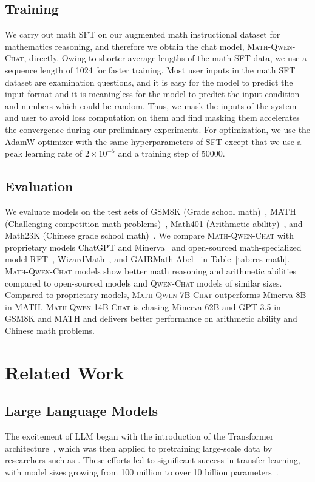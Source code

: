 \subsection{Training}
We carry out math SFT on our augmented math instructional dataset for mathematics reasoning, and therefore we obtain the chat model, \textsc{Math-Qwen-Chat}, directly. Owing to shorter average lengths of the math SFT data, we use a sequence length of \num{1024} for faster training. Most user inputs in the math SFT dataset are examination questions, and it is easy for the model to predict the input format and it is meaningless for the model to predict the input condition and numbers which could be random. Thus, we mask the inputs of the system and user to avoid loss computation on them and find masking them accelerates the convergence during our preliminary experiments. For optimization, we use the AdamW optimizer with the same hyperparameters of SFT except that we use a peak learning rate of $2 \times 10^{-5}$ and a training step of \num{50000}. 

\subsection{Evaluation}
We evaluate models on the test sets of GSM8K (Grade school math)~\citep{gsm8k}, MATH (Challenging competition math problems)~\citep{hendrycks2021measuring}, Math401 (Arithmetic ability)~\citep{math401}, and Math23K (Chinese grade school math)~\citep{Wang2017DeepNS}. We compare \textsc{Math-Qwen-Chat} with proprietary models ChatGPT and Minerva~\citep{lewkowycz2022solving} and open-sourced math-specialized model RFT~\citep{rft}, WizardMath~\citep{wizardmath}, and GAIRMath-Abel~\citep{abel} in Table~\ref{tab:res-math}.
\textsc{Math-Qwen-Chat} models show better math reasoning and arithmetic abilities compared to open-sourced models and \textsc{Qwen-Chat} models of similar sizes. Compared to proprietary models, \textsc{Math-Qwen-7B-Chat} outperforms Minerva-8B in MATH.
\textsc{Math-Qwen-14B-Chat} is chasing Minerva-62B and GPT-3.5 in GSM8K and MATH and delivers better performance on arithmetic ability and Chinese math problems.

\section{Related Work}
\label{sec:related-work}

\subsection{Large Language Models} The excitement of LLM began with the introduction of the Transformer architecture~\citep{transformer}, which was then applied to pretraining large-scale data by researchers such as \citet{gpt, bert, roberta}. These efforts led to significant success in transfer learning, with model sizes growing from \num{100} million to over \num{10} billion parameters~\citep{t5, megatron}. 

